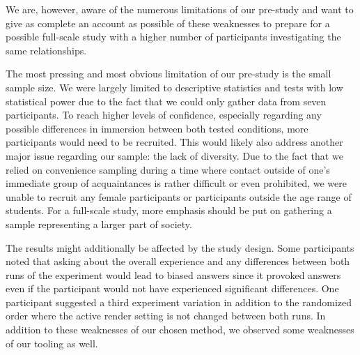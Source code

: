 \documentclass[12pt,twoside,english]{article}
\begin{document}
We are, however, aware of the numerous limitations of our pre-study and want to give as complete an account as possible of these weaknesses to prepare for a possible full-scale study with a higher number of participants investigating the same relationships.

The most pressing and most obvious limitation of our pre-study is the small sample size.
We were largely limited to descriptive statistics and tests with low statistical power due to the fact that we could only gather data from seven participants.
To reach higher levels of confidence, especially regarding any possible differences in immersion between both tested conditions, more participants would need to be recruited.
This would likely also address another major issue regarding our sample: the lack of diversity.
Due to the fact that we relied on convenience sampling during a time where contact outside of one's immediate group of acquaintances is rather difficult or even prohibited, we were unable to recruit any female participants or participants outside the age range of students.
For a full-scale study, more emphasis should be put on gathering a sample representing a larger part of society.

The results might additionally be affected by the study design.
Some participants noted that asking about the overall experience and any differences between both runs of the experiment would lead to biased answers since it provoked answers even if the participant would not have experienced significant differences.
One participant suggested a third experiment variation in addition to the randomized order where the active render setting is not changed between both runs.
In addition to these weaknesses of our chosen method, we observed some weaknesses of our tooling as well.
\end{document}
